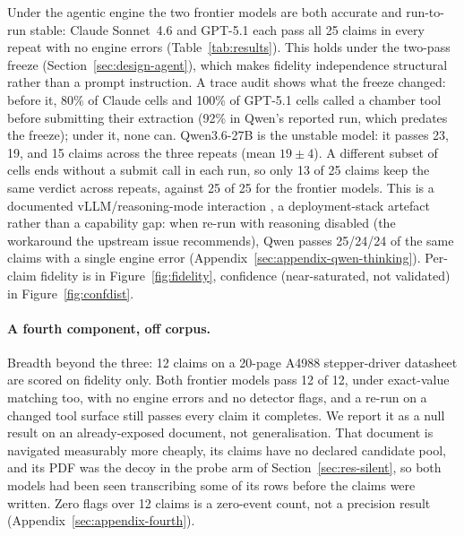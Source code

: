 \documentclass[11pt]{article}
\begin{document}
Under the agentic engine the two frontier models are both accurate and
run-to-run stable: Claude Sonnet~4.6 and GPT-5.1 each pass all 25 claims
in every repeat with no engine errors (Table~\ref{tab:results}). This
holds under the two-pass freeze (Section~\ref{sec:design-agent}), which
makes fidelity independence structural rather than a prompt instruction.
A trace audit shows what the freeze changed: before it, 80\% of Claude
cells and 100\% of GPT-5.1 cells called a chamber tool before
submitting their extraction (92\% in Qwen's reported run, which predates
the freeze); under it, none can. Qwen3.6-27B is the
unstable model: it passes 23, 19, and 15 claims across the three repeats
(mean $19\pm4$). A different subset of cells ends without a submit call
in each run, so only 13 of 25 claims keep the same verdict across
repeats, against 25 of 25 for the frontier models. This is a documented
vLLM/reasoning-mode interaction \citep{qwen3issue1817}, a
deployment-stack artefact rather than a capability gap: when re-run with
reasoning disabled (the workaround the upstream issue recommends), Qwen
passes 25/24/24 of the same claims with a single engine error
(Appendix~\ref{sec:appendix-qwen-thinking}). Per-claim fidelity is in
Figure~\ref{fig:fidelity}, confidence (near-saturated, not validated) in
Figure~\ref{fig:confdist}.

\paragraph{A fourth component, off corpus.}
Breadth beyond the three: 12 claims on a 20-page A4988
stepper-driver datasheet are scored on fidelity only. Both frontier
models pass 12 of 12, under exact-value matching too, with no engine
errors and no detector flags, and a re-run on a changed tool surface
still passes every claim it completes. We report it as a null result on
an already-exposed document, not generalisation. That document is
navigated measurably more cheaply, its claims have no declared candidate
pool, and its PDF was the decoy in the probe arm of
Section~\ref{sec:res-silent}, so both models had been seen
transcribing some of its rows before the claims were written. Zero
flags over 12 claims is a zero-event count, not a precision result
(Appendix~\ref{sec:appendix-fourth}).
\end{document}
